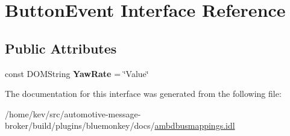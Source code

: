 \hypertarget{interfaceButtonEvent}{\section{Button\+Event Interface Reference}
\label{interfaceButtonEvent}
}
\subsection*{Public Attributes}
\begin{DoxyCompactItemize}
\item 
\hypertarget{interfaceButtonEvent_a1d05bec7109151686be60fe3214f89eb}{const D\+O\+M\+String {\bfseries Yaw\+Rate} = \char`\"{}Value\char`\"{}}\label{interfaceButtonEvent_a1d05bec7109151686be60fe3214f89eb}

\end{DoxyCompactItemize}


The documentation for this interface was generated from the following file\+:\begin{DoxyCompactItemize}
\item 
/home/kev/src/automotive-\/message-\/broker/build/plugins/bluemonkey/docs/\hyperlink{ambdbusmappings_8idl}{ambdbusmappings.\+idl}\end{DoxyCompactItemize}

